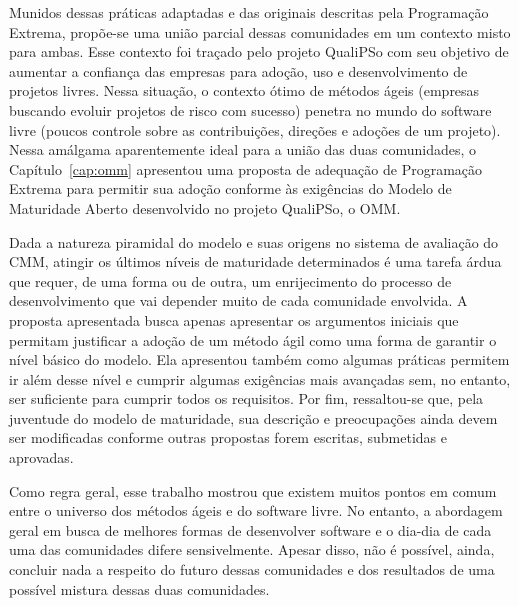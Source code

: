 Munidos dessas práticas adaptadas e das originais descritas pela
Programação Extrema, propõe-se uma união parcial dessas comunidades em
um contexto misto para ambas. Esse contexto foi traçado pelo projeto
QualiPSo com seu objetivo de aumentar a confiança das empresas para
adoção, uso e desenvolvimento de projetos livres.  Nessa situação, o
contexto ótimo de métodos ágeis (empresas buscando evoluir projetos de
risco com sucesso) penetra no mundo do software livre (poucos controle
sobre as contribuições, direções e adoções de um projeto). Nessa
amálgama aparentemente ideal para a união das duas comunidades, o
Capítulo~\ref{cap:omm} apresentou uma proposta de adequação de
Programação Extrema para permitir sua adoção conforme às exigências do
Modelo de Maturidade Aberto desenvolvido no projeto QualiPSo, o OMM.

Dada a natureza piramidal do modelo e suas origens no sistema de
avaliação do CMM, atingir os últimos níveis de maturidade
determinados é uma tarefa árdua que requer, de uma forma ou de outra,
um enrijecimento do processo de desenvolvimento que vai depender muito
de cada comunidade envolvida. A proposta apresentada busca apenas
apresentar os argumentos iniciais que permitam justificar a adoção de
um método ágil como uma forma de garantir o nível básico do
modelo. Ela apresentou também como algumas práticas permitem ir além
desse nível e cumprir algumas exigências mais avançadas sem, no
entanto, ser suficiente para cumprir todos os requisitos. Por fim,
ressaltou-se que, pela juventude do modelo de maturidade, sua
descrição e preocupações ainda devem ser modificadas conforme outras
propostas forem escritas, submetidas e aprovadas.

Como regra geral, esse trabalho mostrou que existem muitos pontos em
comum entre o universo dos métodos ágeis e do software livre. No
entanto, a abordagem geral em busca de melhores formas de desenvolver
software e o dia-dia de cada uma das comunidades difere
sensivelmente. Apesar disso, não é possível, ainda, concluir nada a
respeito do futuro dessas comunidades e dos resultados de uma possível
mistura dessas duas comunidades.

